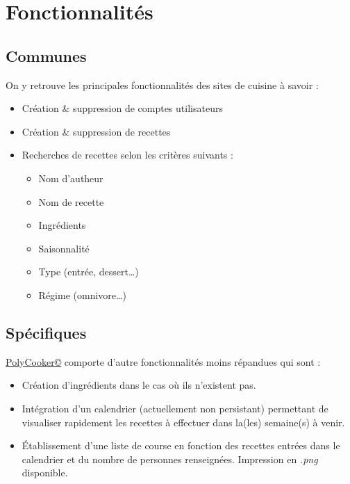 \section{Fonctionnalités}
\setlength{\columnsep}{1cm}
\begin{multicols}{2}
	\subsection{Communes}
	On y retrouve les principales fonctionnalités des sites de cuisine à savoir :
	\begin{itemize}
		\item Création \& suppression de comptes utilisateurs
		\item Création \& suppression de recettes
		\item Recherches de recettes selon les critères suivants :
		\begin{itemize}
			\item Nom d'autheur
			\item Nom de recette
			\item Ingrédients
			\item Saisonnalité
			\item Type (entrée, dessert\dots)
			\item Régime (omnivore\dots)
		\end{itemize}
	\end{itemize}

	\columnbreak
	\subsection{Spécifiques}
	\href{https://polycooker.cluster-ig3.igpolytech.fr/}{PolyCooker©} comporte d'autre fonctionnalités moins répandues qui sont :
	\begin{itemize}
		\item Création d'ingrédients dans le cas où ils n'existent pas.
		\item Intégration d'un calendrier (actuellement non persistant) permettant de visualiser rapidement les recettes à effectuer dans la(les) semaine(s) à venir.
		\item Établissement d'une liste de course en fonction des recettes entrées dans le calendrier et du nombre de personnes renseignées. Impression en \textit{.png} disponible.
	\end{itemize}
	
\end{multicols}